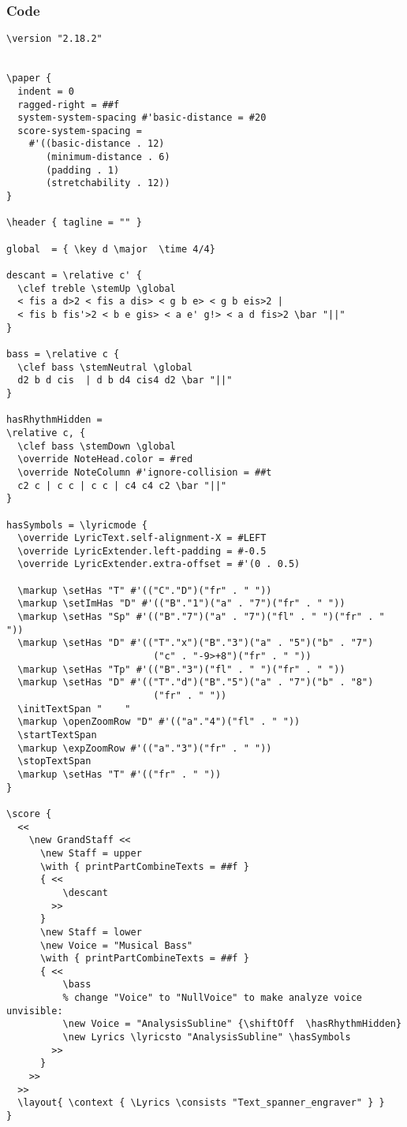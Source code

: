 \documentclass[
  DIV=calc,
  BCOR=5mm,
  12pt,
  headings=small,
  oneside,
  abstract=true,
  toc=bib,
  xcolor=dvipsnames,
  openany,
  ngerman,english]{scrartcl}
\begin{document}
\subsubsection{Code}
\begin{scriptsize}
\begin{verbatim}
\version "2.18.2"


\paper {
  indent = 0
  ragged-right = ##f
  system-system-spacing #'basic-distance = #20
  score-system-spacing =
    #'((basic-distance . 12)
       (minimum-distance . 6)
       (padding . 1)
       (stretchability . 12))
}

\header { tagline = "" }

global  = { \key d \major  \time 4/4}

descant = \relative c' {
  \clef treble \stemUp \global
  < fis a d>2 < fis a dis> < g b e> < g b eis>2 | 
  < fis b fis'>2 < b e gis> < a e' g!> < a d fis>2 \bar "||"
}

bass = \relative c {
  \clef bass \stemNeutral \global
  d2 b d cis  | d b d4 cis4 d2 \bar "||"
}

hasRhythmHidden =
\relative c, {
  \clef bass \stemDown \global
  \override NoteHead.color = #red
  \override NoteColumn #'ignore-collision = ##t
  c2 c | c c | c c | c4 c4 c2 \bar "||"
}

hasSymbols = \lyricmode {
  \override LyricText.self-alignment-X = #LEFT
  \override LyricExtender.left-padding = #-0.5
  \override LyricExtender.extra-offset = #'(0 . 0.5)

  \markup \setHas "T" #'(("C"."D")("fr" . " "))
  \markup \setImHas "D" #'(("B"."1")("a" . "7")("fr" . " "))
  \markup \setHas "Sp" #'(("B"."7")("a" . "7")("fl" . " ")("fr" . " "))
  \markup \setHas "D" #'(("T"."x")("B"."3")("a" . "5")("b" . "7")
                          ("c" . "-9>+8")("fr" . " "))
  \markup \setHas "Tp" #'(("B"."3")("fl" . " ")("fr" . " ")) 
  \markup \setHas "D" #'(("T"."d")("B"."5")("a" . "7")("b" . "8")
                          ("fr" . " "))    
  \initTextSpan "    "
  \markup \openZoomRow "D" #'(("a"."4")("fl" . " "))
  \startTextSpan
  \markup \expZoomRow #'(("a"."3")("fr" . " ")) 
  \stopTextSpan
  \markup \setHas "T" #'(("fr" . " "))
}

\score {
  <<
    \new GrandStaff <<
      \new Staff = upper
      \with { printPartCombineTexts = ##f }
      { <<
          \descant 
        >>
      }
      \new Staff = lower
      \new Voice = "Musical Bass"
      \with { printPartCombineTexts = ##f }
      { <<
          \bass
          % change "Voice" to "NullVoice" to make analyze voice unvisible:
          \new Voice = "AnalysisSubline" {\shiftOff  \hasRhythmHidden}
          \new Lyrics \lyricsto "AnalysisSubline" \hasSymbols
        >>
      }
    >>
  >>
  \layout{ \context { \Lyrics \consists "Text_spanner_engraver" } }
} 
\end{verbatim}
\end{scriptsize}
\end{document}
